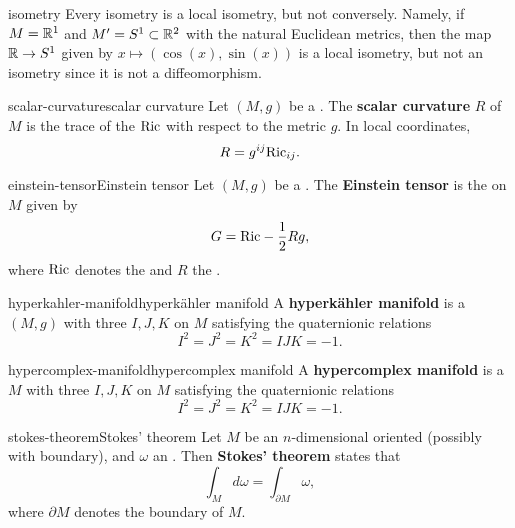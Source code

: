 \begin{example}{isometry}
    Every isometry is a local isometry, but not conversely. Namely, if $M = \mathbb{R}^1$ and $M' = S^1 \subset \mathbb{R}^2$ with the natural Euclidean metrics, then the map $\mathbb{R} \to S^1$ given by $x \mapsto (\cos(x), \sin(x))$ is a local isometry, but not an isometry since it is not a diffeomorphism.
\end{example}

\begin{topic}{scalar-curvature}{scalar curvature}
    Let $(M, g)$ be a . The \textbf{scalar curvature} $R$ of $M$ is the trace of the  $\textup{Ric}$ with respect to the metric $g$. In local coordinates,
    \[ R = g^{ij} \textup{Ric}_{ij} . \]
\end{topic}

\begin{topic}{einstein-tensor}{Einstein tensor}
    Let $(M, g)$ be a . The \textbf{Einstein tensor} is the  on $M$ given by
    \[ G = \textup{Ric} - \frac{1}{2} R g , \]
    where $\textup{Ric}$ denotes the  and $R$ the .
\end{topic}

\begin{topic}{hyperkahler-manifold}{hyperkähler manifold}
    A \textbf{hyperkähler manifold} is a  $(M, g)$ with three  $I, J, K$ on $M$ satisfying the quaternionic relations
    \[ I^2 = J^2 = K^2 = IJK = -1 . \]
\end{topic}

\begin{topic}{hypercomplex-manifold}{hypercomplex manifold}
    A \textbf{hypercomplex manifold} is a  $M$ with three  $I, J, K$ on $M$ satisfying the quaternionic relations
    \[ I^2 = J^2 = K^2 = IJK = -1 . \]
\end{topic}

\begin{topic}{stokes-theorem}{Stokes' theorem}
    Let $M$ be an $n$-dimensional oriented   (possibly with boundary), and $\omega$ an . Then \textbf{Stokes' theorem} states that
    \[ \int_M d \omega = \int_{\partial M} \omega , \]
    where $\partial M$ denotes the boundary of $M$.
\end{topic}

